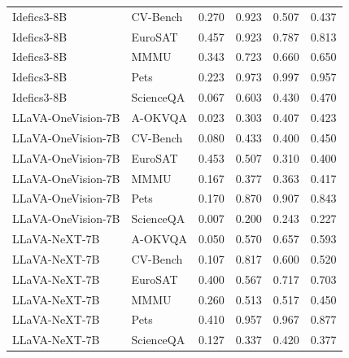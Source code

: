 \begin{tabular}{llrrrr}
Idefics3-8B & CV-Bench & 0.270 & 0.923 & 0.507 & 0.437 \\
Idefics3-8B & EuroSAT & 0.457 & 0.923 & 0.787 & 0.813 \\
Idefics3-8B & MMMU & 0.343 & 0.723 & 0.660 & 0.650 \\
Idefics3-8B & Pets & 0.223 & 0.973 & 0.997 & 0.957 \\
Idefics3-8B & ScienceQA & 0.067 & 0.603 & 0.430 & 0.470 \\
LLaVA-OneVision-7B & A-OKVQA & 0.023 & 0.303 & 0.407 & 0.423 \\
LLaVA-OneVision-7B & CV-Bench & 0.080 & 0.433 & 0.400 & 0.450 \\
LLaVA-OneVision-7B & EuroSAT & 0.453 & 0.507 & 0.310 & 0.400 \\
LLaVA-OneVision-7B & MMMU & 0.167 & 0.377 & 0.363 & 0.417 \\
LLaVA-OneVision-7B & Pets & 0.170 & 0.870 & 0.907 & 0.843 \\
LLaVA-OneVision-7B & ScienceQA & 0.007 & 0.200 & 0.243 & 0.227 \\
LLaVA-NeXT-7B & A-OKVQA & 0.050 & 0.570 & 0.657 & 0.593 \\
LLaVA-NeXT-7B & CV-Bench & 0.107 & 0.817 & 0.600 & 0.520 \\
LLaVA-NeXT-7B & EuroSAT & 0.400 & 0.567 & 0.717 & 0.703 \\
LLaVA-NeXT-7B & MMMU & 0.260 & 0.513 & 0.517 & 0.450 \\
LLaVA-NeXT-7B & Pets & 0.410 & 0.957 & 0.967 & 0.877 \\
LLaVA-NeXT-7B & ScienceQA & 0.127 & 0.337 & 0.420 & 0.377 \\
\bottomrule
\end{tabular}

